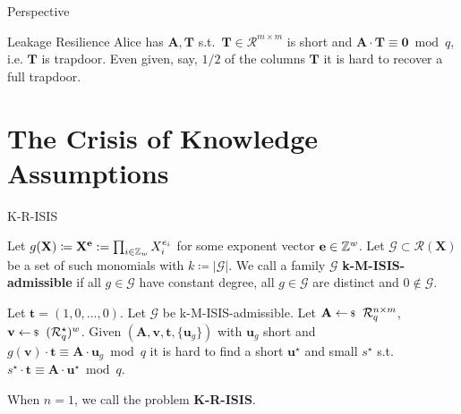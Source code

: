 \documentclass[xcolor=table,10pt,aspectratio=169]{beamer}
\renewcommand{\vec}[1]{\ensuremath{\mathbf{#1}}\xspace}
\providecommand{\mat}[1]{\ensuremath{\vec{#1}}\xspace}
\providecommand{\ring}[0]{\ensuremath{\mathcal{R}}\xspace}
\begin{document}
\begin{frame}[label={sec:orgf3b51d8}]{Perspective}
\begin{alertblock}{Leakage Resilience}
Alice has \(\mat{A}, \mat{T}\) s.t. \(\mat{T} \in \ring^{m \times m}\) is short and \(\mat{A} \cdot \mat{T} \equiv \mat{0} \bmod q\), i.e. \(\mat{T}\) is trapdoor. Even given, say, \(1/2\) of the columns \(\mat{T}\) it is hard to recover a full trapdoor.
\end{alertblock}
\end{frame}

\section{The Crisis of Knowledge Assumptions}
\label{sec:org4ef4c5e}
\begin{frame}[label={sec:org2a900b8}]{K-R-ISIS}
\begin{definition}
Let \(g(\vec{X}) \coloneqq  \vec{X}^{\vec{e}} := \prod_{i \in \ZZ_w} X_i^{e_i}\) for some exponent vector \(\vec{e} \in \ZZ^w\). Let \(\mathcal{G} \subset \mathcal{R}(\vec{X})\) be a set of such monomials with \(k \coloneqq |\mathcal{G}|\). We call a family \(\mathcal{G}\) \textbf{k-M-ISIS-admissible} if all \(g \in \mathcal{G}\) have constant degree, all \(g \in \mathcal{G}\) are distinct and \(0 \not\in\mathcal{G}\).
\end{definition}

\begin{definition}
Let \(\vec{t} = (1,0,\ldots,0)\).
Let \(\mathcal{G}\) be k-M-ISIS-admissible.
Let  \(\mat{A} \sample \ring_q^{n \times m}\), \(\vec{v} \sample (\ring_q^\star)^w\). Given \((\mat{A}, \vec{v}, \vec{t}, \{\vec{u}_{g}\})\) with \(\vec{u}_{g}\) short and \(g(\vec{v}) \cdot \vec{t} \equiv \mat{A}\cdot \vec{u}_{g} \bmod q\) it is hard to find a short \(\vec{u}^{\star}\) and small \(s^{\star}\) s.t. \(s^\star \cdot \vec{t} \equiv \mat{A} \cdot \vec{u}^{\star} \bmod q.\)

When \(n = 1\), we call the problem \textbf{K-R-ISIS}.
\end{definition}

{\footnotesize {} \par}
\end{frame}
\end{document}
